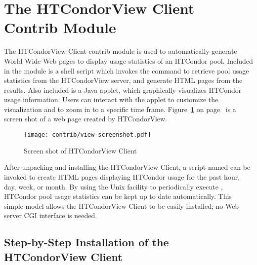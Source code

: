 \section{\label{sec:HTCondorView-Client-Install}
The HTCondorView Client Contrib Module} 

The HTCondorView Client contrib module is used to automatically generate
World Wide Web pages to display usage statistics of an HTCondor
pool.
Included in the module is a shell script which invokes the 
command to retrieve pool usage statistics from the HTCondorView server, and
generate HTML pages from the results.  
Also included is a Java applet, which graphically visualizes HTCondor 
usage information.  
Users can interact with the applet to customize the visualization and to
zoom in to a specific time frame.
Figure~\ref{fig:view-screenshot} on page~\pageref{fig:view-screenshot}
is a screen shot of a web page created by HTCondorView.  

\begin{figure}[hbt]
\centering
\texttt{[image: contrib/view-screenshot.pdf]}
\caption{\label{fig:view-screenshot}Screen shot of HTCondorView Client}
\end{figure}

After unpacking and installing the HTCondorView Client, a script named
 can be invoked to create HTML pages displaying HTCondor usage
for the past hour, day, week, or month.  
By using the Unix  facility to periodically execute
, HTCondor pool usage statistics can be kept up to date
automatically.  
This simple model allows the HTCondorView Client to be easily installed;
no Web server CGI interface is needed.

\subsection{\label{sec:condorview-client-step-by-step}
Step-by-Step Installation of the HTCondorView Client}


